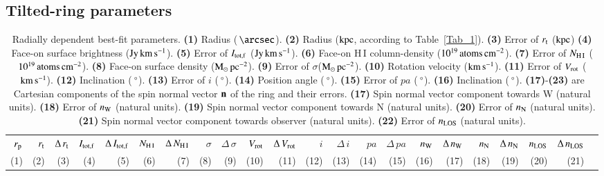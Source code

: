 \documentclass[oldversion]{aa}
\renewcommand{\deg}{\hbox{$^\circ$}}
\begin{document}
\begin{landscape}
\section{Tilted-ring parameters}
\label{Sect_4.9}
\begin{table}[hbp]
\begin{center}
\caption{
Radially dependent best-fit parameters.
{\bf (1)}  Radius ($\,\arcsec$).
{\bf (2)}  Radius ($\rm kpc$, according to Table~\ref{Tab_1}).
{\bf (3)}  Error of $ r_{\rm t} $ ($\rm kpc$)
{\bf (4)}  Face-on surface brightness (${\rm Jy}\,{\rm km}\,{\rm s}^{-1}$).
{\bf (5)}  Error of $I_{\rm tot,f}$ (${\rm Jy}\,{\rm km}\,{\rm s}^{-1}$).
{\bf (6)}  Face-on {H\,{\small I}} column-density ($10^{19}\,{\rm atoms}\,{\rm cm}^{-2}$).
{\bf (7)}  Error of $N_{\rm {H\,{\small I}}}$ ($10^{19}\,{\rm atoms}\,{\rm cm}^{-2}$).
{\bf (8)}  Face-on surface density (${\rm M}_{\odot}\,{\rm pc}^{-2}$).
{\bf (9)}  Error of $\sigma$(${\rm M}_{\odot}\,{\rm pc}^{-2}$).
{\bf (10)} Rotation velocity (${\rm km}\,{\rm s}^{-1}$).
{\bf (11)} Error of $V_{\rm rot}$ (${\rm km}\,{\rm s}^{-1}$).
{\bf (12)} Inclination ($\,\deg$).
{\bf (13)} Error of $i$ ($\,\deg$).
{\bf (14)} Position angle ($\,\deg$).
{\bf (15)} Error of $pa$ ($\,\deg$).
{\bf (16)} Inclination ($\,\deg$).
{\bf (17)}-{\bf (23)} are Cartesian components of the spin normal
vector ${\bf n}$ of the ring and their errors.
{\bf (17)} Spin normal vector component towards W (natural units).
{\bf (18)} Error of $n_{\rm W}$ (natural units).
{\bf (19)} Spin normal vector component towards N (natural units).
{\bf (20)} Error of $n_{\rm N}$ (natural units).
{\bf (21)} Spin normal vector component towards observer (natural units).
{\bf (22)} Error of $n_{\rm LOS}$ (natural units).
}
\label{Tab_5}
\begin{tabular}{r r r r r r r r r r r r r r r r r r r r r r}
\hline
\hline
$ r_{\rm p} $ & $ r_{\rm t} $ & $\Delta\,r_{\rm t}$ & $ I_{\rm tot,f} $ & $\Delta\,I_{\rm tot,f}$ & $ N_{\rm {H\,{\small I}}} $ & $ \Delta\,N_{\rm {H\,{\small I}}} $ & $\sigma$ & $\Delta\,\sigma$ & $V_{\rm rot}$ & $\Delta\,V_{\rm rot}$ & $i$ & $\Delta\,i$ & $pa$ & $\Delta\,pa$ & $n_{\rm W}$ &  $\Delta\,n_{\rm W}$ & $n_{\rm N}$ & $\Delta\,n_{\rm N}$ & $n_{\rm LOS}$ & $\Delta\,n_{\rm LOS}$ \\
(1)           & (2)           & (3)                 & (4)               & (5)                     & (6)                         & (7)                                 & (8)      & (9)              & (10)          & (11)                  & (12)          & (13)                & (14)              & (15)                    & (16)           & (17)                   & (18)     & (19)            & (20)          & (21)\\

\end{tabular}
\end{center}
\end{table}
\end{landscape}
\end{document}
